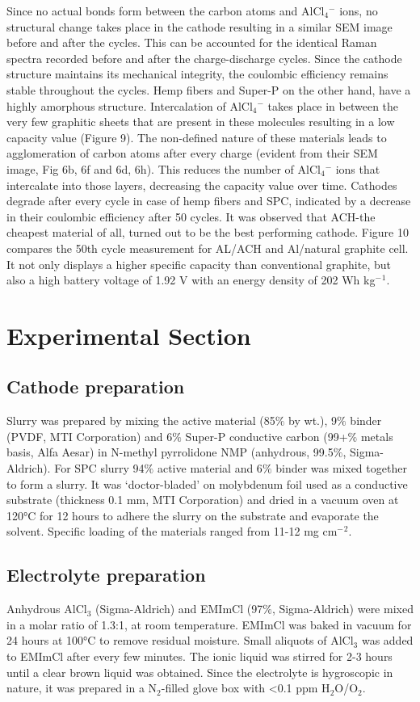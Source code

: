 \documentclass{article}
\begin{document}
Since no actual bonds form between the carbon atoms and AlCl$_4{^-}$ ions, no structural change takes place in the cathode resulting in a similar SEM image before and after the cycles. This can be accounted for the identical Raman spectra recorded before and after the charge-discharge cycles.  Since the cathode structure maintains its mechanical integrity, the coulombic efficiency remains stable throughout the cycles. Hemp fibers and Super-P on the other hand, have a highly amorphous structure. Intercalation of AlCl$_4{^-}$ takes place in between the very few graphitic sheets that are present in these molecules resulting in a low capacity value (Figure 9). The non-defined nature of these materials leads to agglomeration of carbon atoms after every charge (evident from their SEM image, Fig 6b, 6f and 6d, 6h). This reduces the number of AlCl$_4{^-}$ ions that intercalate into those layers, decreasing the capacity value over time. Cathodes degrade after every cycle in case of hemp fibers and SPC, indicated by a decrease in their coulombic efficiency after 50 cycles.  It was observed that ACH-the cheapest material of all, turned out to be the best performing cathode. Figure 10 compares the 50th cycle measurement for AL/ACH and Al/natural graphite cell. It not only displays a higher specific capacity than conventional graphite, but also a high battery voltage of 1.92 V with an energy density of 202 Wh kg$^-{^1}$. 


\section{Experimental Section}
\subsection{Cathode preparation}
Slurry was prepared by mixing the active material (85$\%$ by wt.), 9$\%$ binder (PVDF, MTI Corporation) and 6$\%$ Super-P conductive carbon (99+$\%$ metals basis, Alfa Aesar) in N-methyl pyrrolidone NMP (anhydrous, 99.5$\%$, Sigma-Aldrich). For SPC slurry 94$\%$ active material and 6$\%$ binder was mixed together to form a slurry. It was ‘doctor-bladed’ on molybdenum foil used as a conductive substrate (thickness 0.1 mm, MTI Corporation) and dried in a vacuum oven at 120°C for 12 hours to adhere the slurry on the substrate and evaporate the solvent. Specific loading of the materials ranged from 11-12 mg cm$^-{^2}$. 
\subsection{Electrolyte preparation}
Anhydrous AlCl$_3$ (Sigma-Aldrich) and EMImCl (97$\%$, Sigma-Aldrich) were mixed in a molar ratio of 1.3:1, at room temperature. EMImCl was baked in vacuum for 24 hours at 100°C to remove residual moisture. Small aliquots of AlCl$_3$ was added to EMImCl after every few minutes. The ionic liquid was stirred for 2-3 hours until a clear brown liquid was obtained. Since the electrolyte is hygroscopic in nature, it was prepared in a N$_2$-filled glove box with <0.1 ppm H$_2$O/O$_2$. 
\end{document}
